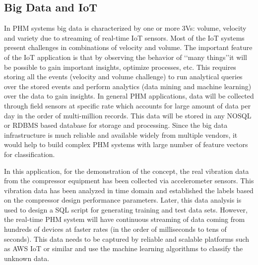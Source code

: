 \documentclass[sigconf]{acmart}
\begin{document}
\subsection{Big Data and IoT}
In PHM systems big data is characterized by one or more 3Vs: volume, velocity and variety due to streaming of real-time IoT sensors. Most of the IoT systems present challenges in combinations of velocity and volume. The important feature of the IoT application is that by observing the behavior of \lq\lq many things\rq\rq it will be possible to gain important insights, optimize processes, etc. This requires storing all the events (velocity and volume challenge) to run analytical queries over the stored events and perform analytics (data mining and machine learning) over the data to gain insights.
In general PHM applications, data will be collected through field sensors at specific rate which accounts for large amount of data per day in the order of multi-million records. This data will be stored in any NOSQL or RDBMS based database for storage and processing. Since the big data infrastructure is much reliable and available widely from multiple vendors, it would help to build complex PHM systems with large number of feature vectors for classification. 

In this application, for the demonstration of the concept, the real vibration data from the compressor equipment has been collected via accelerometer sensors. This vibration data has been analyzed in time domain and established the labels based on the compressor design performance parameters. Later, this data analysis is used to design a SQL script for generating training and test data sets. However, the real-time PHM system will have continuous streaming of data coming from hundreds of devices at faster rates (in the order of milliseconds to tens of seconds). This data needs to be captured by reliable and scalable platforms such as AWS IoT or similar and use the machine learning algorithms to classify the unknown data.
\end{document}
